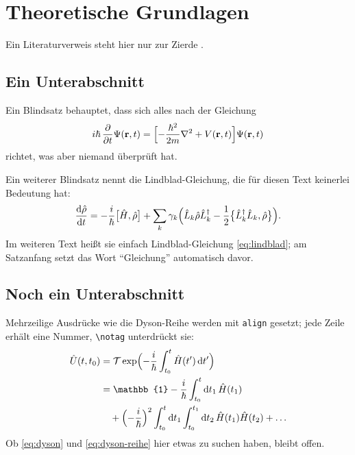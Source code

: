 \section{Theoretische Grundlagen}

\blindtext{} Ein Literaturverweis steht hier nur zur Zierde
\cite{zinth_optik_2018}.

\subsection{Ein Unterabschnitt}

Ein Blindsatz behauptet, dass sich alles nach der Gleichung
\begin{equation}
  i\hbar\,\frac{\partial}{\partial t}\Psi(\mathbf{r},t)
  = \Bigl[-\frac{\hbar^{2}}{2m}\nabla^{2} + V(\mathbf{r},t)\Bigr]
    \Psi(\mathbf{r},t)
  \label{eq:schroedinger}
\end{equation}
richtet, was aber niemand überprüft hat.

Ein weiterer Blindsatz nennt die Lindblad-Gleichung, die für diesen Text
keinerlei Bedeutung hat:
\begin{equation}
  \frac{\mathrm{d}\hat\rho}{\mathrm{d}t}
  = -\frac{i}{\hbar}\bigl[\hat H, \hat\rho\bigr]
    + \sum_{k} \gamma_{k} \Bigl( \hat L_{k} \hat\rho \hat L_{k}^{\dagger}
    - \frac{1}{2} \bigl\{ \hat L_{k}^{\dagger} \hat L_{k}, \hat\rho \bigr\}
    \Bigr) .
  \label{eq:lindblad}
\end{equation}
Im weiteren Text heißt sie einfach Lindblad-Gleichung \cref{eq:lindblad};
 am Satzanfang setzt das Wort \enquote{Gleichung}
automatisch davor.

\subsection{Noch ein Unterabschnitt}

\blindtext

Mehrzeilige Ausdrücke wie die Dyson-Reihe werden mit \texttt{align}
gesetzt; jede Zeile erhält eine Nummer, \verb|\notag| unterdrückt sie:
\begin{align}
  \hat U(t, t_{0})
  &= \mathcal{T} \exp\Bigl( -\frac{i}{\hbar} \int_{t_{0}}^{t}
       \hat H(t')\, \mathrm{d}t' \Bigr)
     \label{eq:dyson} \\
  &= \mathbb{1} - \frac{i}{\hbar} \int_{t_{0}}^{t} \mathrm{d}t_{1}\,
       \hat H(t_{1}) \notag \\
  &\quad + \Bigl(-\frac{i}{\hbar}\Bigr)^{2} \int_{t_{0}}^{t} \mathrm{d}t_{1}
       \int_{t_{0}}^{t_{1}} \mathrm{d}t_{2}\, \hat H(t_{1}) \hat H(t_{2})
       + \dots
     \label{eq:dyson-reihe}
\end{align}
Ob \cref{eq:dyson} und \cref{eq:dyson-reihe} hier etwas zu suchen haben,
bleibt offen.
